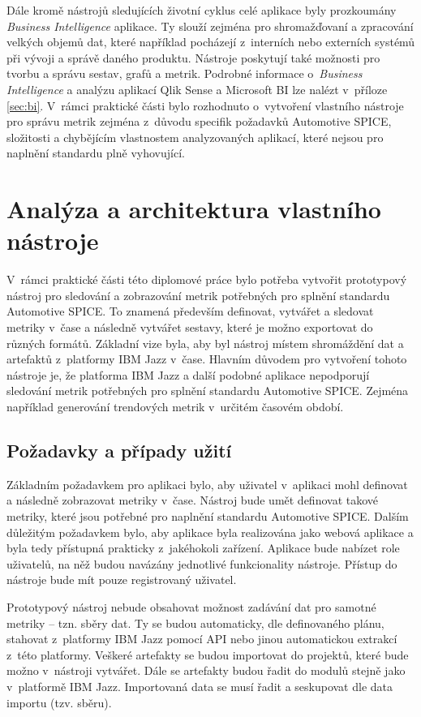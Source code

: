 \documentclass[czech,master]{diploma}
\begin{document}
Dále kromě nástrojů sledujících životní cyklus celé aplikace byly prozkoumány \textit{Business Intelligence} aplikace. Ty slouží zejména pro shromažďovaní a zpracování velkých objemů dat, které například pocházejí z~interních nebo externích systémů při vývoji a správě daného produktu. Nástroje poskytují také možnosti pro tvorbu a správu sestav, grafů a metrik. Podrobné informace o~\textit{Business Intelligence} a analýzu aplikací Qlik Sense a Microsoft BI lze nalézt v~příloze \ref{sec:bi}. V~rámci praktické části bylo rozhodnuto o~vytvoření vlastního nástroje pro správu metrik zejména z~důvodu specifik požadavků Automotive SPICE, složitosti a chybějícím vlastnostem analyzovaných aplikací, které nejsou pro naplnění standardu plně vyhovující.

\chapter{Analýza a architektura vlastního nástroje}
\label{sec:my_app}
V~rámci  praktické části této diplomové práce bylo potřeba vytvořit  prototypový nástroj pro sledování a zobrazování metrik potřebných pro splnění standardu Automotive SPICE. To znamená především definovat, vytvářet a sledovat metriky v~čase a následně vytvářet sestavy, které je možno exportovat do různých formátů. Základní vize byla, aby byl nástroj místem shromáždění dat a artefaktů z~platformy IBM Jazz v~čase. Hlavním důvodem pro vytvoření tohoto nástroje je, že platforma IBM Jazz a další podobné aplikace nepodporují sledování metrik potřebných pro splnění standardu Automotive SPICE. Zejména například generování trendových metrik v~určitém časovém období.

\section{Požadavky a případy užití}
\label{sec:requirements}
Základním požadavkem pro aplikaci bylo, aby uživatel v~aplikaci mohl definovat a následně zobrazovat metriky v~čase. Nástroj bude umět definovat takové metriky, které jsou potřebné pro naplnění standardu Automotive SPICE. Dalším důležitým požadavkem bylo, aby aplikace byla realizována jako webová aplikace a byla tedy přístupná prakticky z~jakéhokoli zařízení. Aplikace bude nabízet role uživatelů, na něž budou navázány jednotlivé funkcionality nástroje. Přístup do nástroje bude mít pouze registrovaný uživatel.

Prototypový nástroj nebude obsahovat možnost zadávání dat pro samotné metriky -- tzn. sběry dat. Ty se budou automaticky, dle definovaného plánu, stahovat z~platformy IBM Jazz pomocí API nebo jinou automatickou extrakcí z~této platformy. Veškeré artefakty se budou importovat do projektů, které bude možno v~nástroji vytvářet. Dále se artefakty budou řadit do modulů stejně jako v~platformě IBM Jazz. Importovaná data se musí řadit a seskupovat dle data importu (tzv. sběru).
\end{document}
